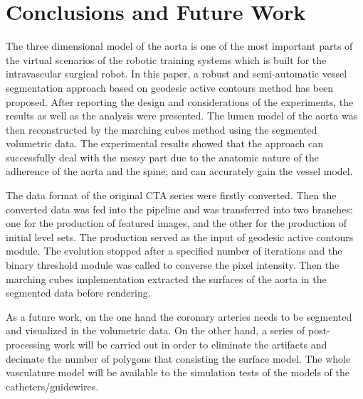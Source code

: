 \section{Conclusions and Future Work}

The three dimensional model of the aorta is one of the most important parts of the virtual scenarios of the robotic training systems which is built for the intravascular surgical robot.
In this paper, a robust and semi-automatic vessel segmentation approach based on geodesic active contours method has been proposed.
After reporting the design and considerations of the experiments, the results as well as the analysis were presented.
The lumen model of the aorta was then reconstructed by the marching cubes method using the segmented volumetric data.
The experimental results showed that the approach can successfully deal with the messy part due to the anatomic nature of the adherence of the aorta and the spine; and can accurately gain the vessel model.

The data format of the original CTA series were firstly converted.
Then the converted data was fed into the pipeline and was transferred into two branches: one for the production of featured images, and the other for the production of initial level sets.
The production served as the input of geodesic active contours module.
The evolution stopped after a specified number of iterations and the binary threshold module was called to converse the pixel intensity.
Then the marching cubes implementation extracted the surfaces of the aorta in the segmented data before rendering.

As a future work, on the one hand the coronary arteries needs to be segmented and visualized in the volumetric data.
On the other hand, a series of post-processing work will be carried out in order to eliminate the artifacts and decimate the number of polygons that consisting the surface model.
The whole vasculature model will be available to the simulation tests of the models of the catheters/guidewires.
